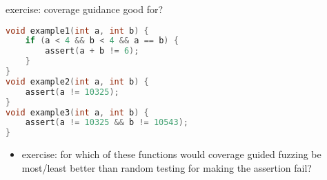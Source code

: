 \begin{frame}[fragile,label=covFuzzExercise]{exercise: coverage guidance good for?}
\begin{lstlisting}[language=C,style=smaller]
void example1(int a, int b) {
    if (a < 4 && b < 4 && a == b) {
        assert(a + b != 6);
    }
}
void example2(int a, int b) {
    assert(a != 10325);
}
void example3(int a, int b) {
    assert(a != 10325 && b != 10543);
}
\end{lstlisting}
\begin{itemize}
\item exercise: for which of these functions would coverage guided fuzzing be most/least better
than random testing for making the assertion fail?
\end{itemize}
\end{frame}
